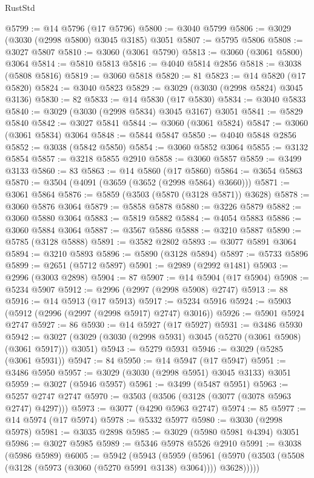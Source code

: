 \begin{lexlean}{RustStd}
\begin{coremodule}
@5799 := @14 @5796 (@17 @5796)
@5800 := @3040 @5799
@5806 := @3029 (@3030 (@2998 @5800) @3045 @3185) @3051
@5807 := @5795 @5806
@5808 := @3027 @5807
@5810 := @3060 (@3061 @5790)
@5813 := @3060 (@3061 @5800) @3064
@5814 := @5810 @5813
@5816 := @4040 @5814 @2856
@5818 := @3038 (@5808 @5816)
@5819 := @3060 @5818
@5820 := 81
@5823 := @14 @5820 (@17 @5820)
@5824 := @3040 @5823
@5829 := @3029 (@3030 (@2998 @5824) @3045 @3136)
@5830 := 82
@5833 := @14 @5830 (@17 @5830)
@5834 := @3040 @5833
@5840 := @3029 (@3030 (@2998 @5834) @3045 @3167) @3051
@5841 := @5829 @5840
@5842 := @3027 @5841
@5844 := @3060 (@3061 @5824)
@5847 := @3060 (@3061 @5834) @3064
@5848 := @5844 @5847
@5850 := @4040 @5848 @2856
@5852 := @3038 (@5842 @5850)
@5854 := @3060 @5852 @3064
@5855 := @3132 @5854
@5857 := @3218 @5855 @2910
@5858 := @3060 @5857
@5859 := @3499 @3133
@5860 := 83
@5863 := @14 @5860 (@17 @5860)
@5864 := @3654 @5863
@5870 := @3504 (@4091 (@3659 (@3652 (@2998 @5864) @3660)))
@5871 := @3061 @5864
@5876 := @5859 (@3503 (@5870 (@3128 @5871)) @3628)
@5878 := @3060 @5876 @3064
@5879 := @5858 @5878
@5880 := @3226 @5879
@5882 := @3060 @5880 @3064
@5883 := @5819 @5882
@5884 := @4054 @5883
@5886 := @3060 @5884 @3064
@5887 := @3567 @5886
@5888 := @3210 @5887
@5890 := @5785 (@3128 @5888)
@5891 := @3582 @2802
@5893 := @3077 @5891 @3064
@5894 := @3210 @5893
@5896 := @5890 (@3128 @5894)
@5897 := @5733 @5896
@5899 := @2651 (@5712 @5897)
@5901 := @2989 (@2992 @1481)
@5903 := @2996 (@3003 @2898)
@5904 := 87
@5907 := @14 @5904 (@17 @5904)
@5908 := @5234 @5907
@5912 := @2996 (@2997 (@2998 @5908) @2747)
@5913 := 88
@5916 := @14 @5913 (@17 @5913)
@5917 := @5234 @5916
@5924 := @5903 (@5912 (@2996 (@2997 (@2998 @5917) @2747) @3016))
@5926 := @5901 @5924 @2747
@5927 := 86
@5930 := @14 @5927 (@17 @5927)
@5931 := @3486 @5930
@5942 := @3027 (@3029 (@3030 (@2998 @5931) @3045 (@5270 (@3061 @5908) (@3061 @5917))) @3051)
@5943 := @5279 @5931
@5946 := @3029 (@5285 (@3061 @5931))
@5947 := 84
@5950 := @14 @5947 (@17 @5947)
@5951 := @3486 @5950
@5957 := @3029 (@3030 (@2998 @5951) @3045 @3133) @3051
@5959 := @3027 (@5946 @5957)
@5961 := @3499 (@5487 @5951)
@5963 := @5257 @2747 @2747
@5970 := @3503 (@3506 (@3128 (@3077 (@3078 @5963 @2747) @4297)))
@5973 := @3077 (@4290 @5963 @2747)
@5974 := 85
@5977 := @14 @5974 (@17 @5974)
@5978 := @5332 @5977
@5980 := @3030 (@2998 @5978)
@5981 := @3035 @2898
@5985 := @3029 (@5980 @5981 @4394) @3051
@5986 := @3027 @5985
@5989 := @5346 @5978 @5526 @2910
@5991 := @3038 (@5986 @5989)
@6005 := @5942
    (@5943
      (@5959
        (@5961 (@5970 (@3503 (@5508 (@3128 (@5973 (@3060 (@5270 @5991 @3138) @3064)))) @3628)))))

\end{coremodule}
\end{lexlean}
